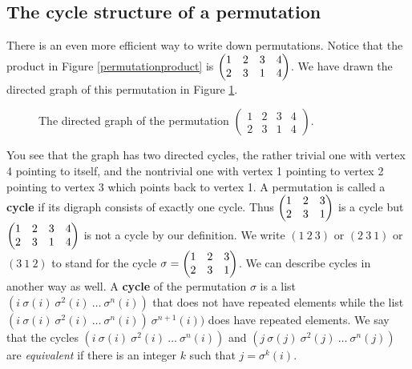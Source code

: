 \ep



\subsection{The cycle structure of a permutation}
There is an even more efficient way to write down permutations.  Notice
that the product in Figure \ref{permutationproduct} is
$\begin{pmatrix}1&2&3&4\cr2&3&1&4\end{pmatrix}$. 
  We have drawn the directed graph of this
permutation in Figure \ref{permutationcycledigraph}. 
\begin{figure}[htb]\caption[The directed graph of the permutation
  $(1\, 2\, 3)(4)$]{The
directed graph of the permutation
$\begin{pmatrix}1&2&3&4\\
2&3&1&4\end{pmatrix}$.}
\label{permutationcycledigraph}\smallskip
\begin{center}\mbox{}
\end{center}  
\end{figure}
  You see that the
graph has two directed cycles, the rather trivial one with vertex 4
pointing to itself, and the nontrivial one with vertex 1 pointing to
vertex 2 pointing to vertex 3 which points back to vertex 1.  A
permutation is called a {\bf cycle} if its digraph consists of
exactly one
 cycle.  Thus $\begin{pmatrix}1&2&3\cr2&3&1\end{pmatrix}$ is a cycle but
$\begin{pmatrix}1&2&3&4\cr2&3&1&4\end{pmatrix}$ is not a cycle by our definition.  We write
$(1\ 2\ 3)$ or $(2\ 3\ 1)$ or $(3\ 1\ 2)$ to stand for the cycle
$\sigma =\begin{pmatrix}1&2&3\cr2&3&1\end{pmatrix}$.  We can describe cycles in another way
as well.  A {\bf cycle} of the permutation
$\sigma$ is a list
$(i\ 
\sigma(i)\ 
\sigma^2(i)
\ \ldots\ 
\sigma^n(i))$ that does not have repeated elements
while the list $(i\ \sigma(i)\ 
\sigma^2(i)\ \ldots\ \sigma^n(i))\ \sigma^{n+1}(i))$  does have repeated
elements. We say that the cycles $(i\ 
\sigma(i)\ 
\sigma^2(i)\ \ldots\ \sigma^n(i))$ and $(j\ 
\sigma(j)\ 
\sigma^2(j)\ \ldots\ \sigma^n(j))$ are {\em equivalent} if there is an
integer $k$ such that 
$j=
\sigma^k(i)$.

